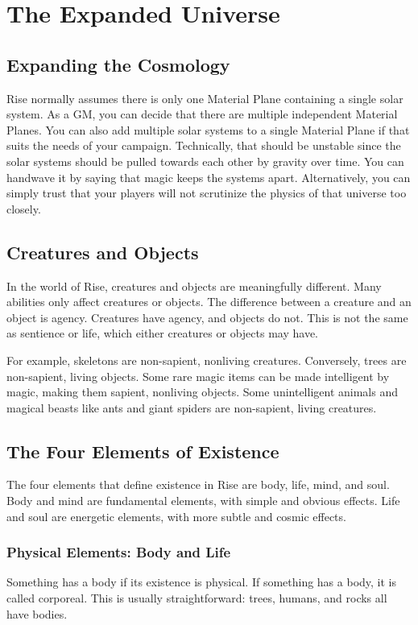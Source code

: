\chapter{The Expanded Universe}

\section{Expanding the Cosmology}
  Rise normally assumes there is only one Material Plane containing a single solar system.
  As a GM, you can decide that there are multiple independent Material Planes.
  You can also add multiple solar systems to a single Material Plane if that suits the needs of your campaign.
  Technically, that should be unstable since the solar systems should be pulled towards each other by gravity over time.
  You can handwave it by saying that magic keeps the systems apart.
  Alternatively, you can simply trust that your players will not scrutinize the physics of that universe too closely.

\section{Creatures and Objects}
  In the world of Rise, creatures and objects are meaningfully different.
  Many abilities only affect creatures or objects.
  The difference between a creature and an object is agency.
  Creatures have agency, and objects do not.
  This is not the same as sentience or life, which either creatures or objects may have.

  For example, skeletons are non-sapient, nonliving creatures.
  Conversely, trees are non-sapient, living objects.
  Some rare magic items can be made intelligent by magic, making them sapient, nonliving objects.
  Some unintelligent animals and magical beasts like ants and giant spiders are non-sapient, living creatures.

\section{The Four Elements of Existence}

  The four elements that define existence in Rise are body, life, mind, and soul.
  Body and mind are fundamental elements, with simple and obvious effects.
  Life and soul are energetic elements, with more subtle and cosmic effects.

  \subsection{Physical Elements: Body and Life}
    Something has a body if its existence is physical.
    If something has a body, it is called corporeal.
    This is usually straightforward: trees, humans, and rocks all have bodies.

